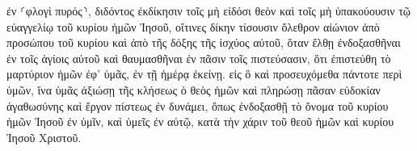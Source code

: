 \documentclass{openreader}
\begin{document}
ἐν ⸂φλογὶ πυρός⸃, διδόντος ἐκδίκησιν τοῖς μὴ εἰδόσι θεὸν καὶ τοῖς μὴ ὑπακούουσιν τῷ εὐαγγελίῳ τοῦ κυρίου ἡμῶν Ἰησοῦ, 
οἵτινες δίκην τίσουσιν ὄλεθρον αἰώνιον ἀπὸ προσώπου τοῦ κυρίου καὶ ἀπὸ τῆς δόξης τῆς ἰσχύος αὐτοῦ, 
ὅταν ἔλθῃ ἐνδοξασθῆναι ἐν τοῖς ἁγίοις αὐτοῦ καὶ θαυμασθῆναι ἐν πᾶσιν τοῖς πιστεύσασιν, ὅτι ἐπιστεύθη τὸ μαρτύριον ἡμῶν ἐφ’ ὑμᾶς, ἐν τῇ ἡμέρᾳ ἐκείνῃ. 
εἰς ὃ καὶ προσευχόμεθα πάντοτε περὶ ὑμῶν, ἵνα ὑμᾶς ἀξιώσῃ τῆς κλήσεως ὁ θεὸς ἡμῶν καὶ πληρώσῃ πᾶσαν εὐδοκίαν ἀγαθωσύνης καὶ ἔργον πίστεως ἐν δυνάμει, 
ὅπως ἐνδοξασθῇ τὸ ὄνομα τοῦ κυρίου ἡμῶν Ἰησοῦ ἐν ὑμῖν, καὶ ὑμεῖς ἐν αὐτῷ, κατὰ τὴν χάριν τοῦ θεοῦ ἡμῶν καὶ κυρίου Ἰησοῦ Χριστοῦ. 
\end{document}
